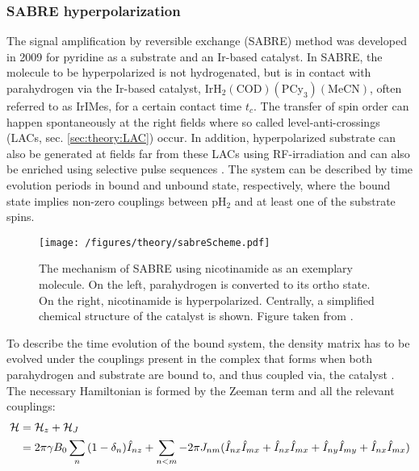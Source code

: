         \subsubsection{SABRE hyperpolarization}
        \label{sec:theory:HPSabre}
        The signal amplification by reversible exchange (SABRE) method was developed in 2009 \cite{adams_reversible_2009-2} for pyridine as a substrate and an Ir-based catalyst.
        In SABRE, the molecule to be hyperpolarized is not hydrogenated, but is in contact with parahydrogen via the Ir-based catalyst, $\mathrm{IrH_2(COD)(PCy_3)(MeCN)}$, often referred to as IrIMes, for a certain contact time $t_c$. The transfer of spin order can happen spontaneously at the right fields \cite{atkinson_spontaneous_2009-1} where so called level-anti-crossings (LACs, sec. \ref{sec:theory:LAC}) occur. In addition, hyperpolarized substrate can also be generated at fields far from these LACs using RF-irradiation \cite{pravdivtsev_spin_2014, knecht_quantitative_2019} and can also be enriched using selective pulse sequences \cite{knecht_re-polarization_2018-1}. The system can be described by time evolution periods in bound and unbound state, respectively, where the bound state implies non-zero couplings between pH$_2$ and at least one of the substrate spins.
            \begin{figure}
                \centering
                \texttt{[image: /figures/theory/sabreScheme.pdf]}
                \caption[SABRE scheme]{The mechanism of SABRE using nicotinamide as an exemplary molecule. On the left, parahydrogen is converted to its ortho state. On the right, nicotinamide is hyperpolarized. Centrally, a simplified chemical structure of the catalyst is shown. Figure taken from \cite{rovedo_molecular_2016}.}
            \end{figure}
            To describe the time evolution of the bound system, the density matrix has to be evolved under the couplings present in the complex that forms when both parahydrogen and substrate are bound to, and thus coupled via, the catalyst \cite{cowley_iridium_2011-1}. The necessary Hamiltonian is formed by the Zeeman term and all the relevant couplings:
            \begin{equation}
                \begin{aligned}
                    \mathcal{H}& = \mathcal{H}_z + \mathcal{H}_J \\
                        & =\-2\pi\gamma B_0 \sum_n{(1-\delta_n)\hat{I}_{nz}} + \sum_{n<m} -2\pi J_{nm}(\hat{I}_{nx}\hat{I}_{mx} + \hat{I}_{nx}\hat{I}_{mx}+ \hat{I}_{ny}\hat{I}_{my} + \hat{I}_{nx}\hat{I}_{mx})
                \end{aligned}
            \end{equation}
